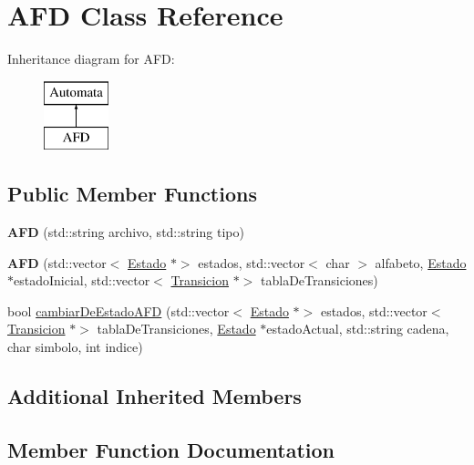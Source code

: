 \hypertarget{class_a_f_d}{}\section{A\+FD Class Reference}
\label{class_a_f_d}
Inheritance diagram for A\+FD\+:\begin{figure}[H]
\begin{center}
\leavevmode
\includegraphics[height=2.000000cm]{class_a_f_d}
\end{center}
\end{figure}
\subsection*{Public Member Functions}
\begin{DoxyCompactItemize}
\item 
\mbox{\label{class_a_f_d_a145cb15cbb67e68be849c2169bb91ad5}} 
{\bfseries A\+FD} (std\+::string archivo, std\+::string tipo)
\item 
\mbox{\label{class_a_f_d_a2cf1c9284bfa3a73d44d36c2a48013f7}} 
{\bfseries A\+FD} (std\+::vector$<$ \hyperlink{class_estado}{Estado} $\ast$$>$ estados, std\+::vector$<$ char $>$ alfabeto, \hyperlink{class_estado}{Estado} $\ast$estado\+Inicial, std\+::vector$<$ \hyperlink{class_transicion}{Transicion} $\ast$$>$ tabla\+De\+Transiciones)
\item 
bool \hyperlink{class_a_f_d_a58a86635aa33739a2b58cfa06bdd9d3d}{cambiar\+De\+Estado\+A\+FD} (std\+::vector$<$ \hyperlink{class_estado}{Estado} $\ast$$>$ estados, std\+::vector$<$ \hyperlink{class_transicion}{Transicion} $\ast$$>$ tabla\+De\+Transiciones, \hyperlink{class_estado}{Estado} $\ast$estado\+Actual, std\+::string cadena, char simbolo, int indice)
\end{DoxyCompactItemize}
\subsection*{Additional Inherited Members}


\subsection{Member Function Documentation}
\mbox{\label{class_a_f_d_a58a86635aa33739a2b58cfa06bdd9d3d}} 
